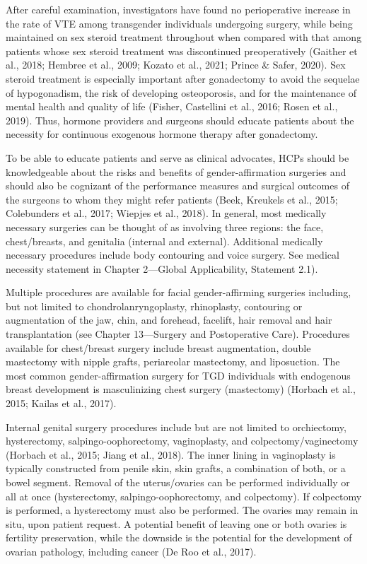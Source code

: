 \documentclass[
]{book}
\begin{document}
After careful examination, investigators have
found no perioperative increase in the rate of
VTE among transgender individuals undergoing
surgery, while being maintained on sex steroid
treatment throughout when compared with that
among patients whose sex steroid treatment was
discontinued preoperatively (Gaither et al., 2018;
Hembree et al., 2009; Kozato et al., 2021; Prince
\& Safer, 2020). Sex steroid treatment is especially
important after gonadectomy to avoid the sequelae
of hypogonadism, the risk of developing osteoporosis, and for the maintenance of mental health
and quality of life (Fisher, Castellini et al., 2016;
Rosen et al., 2019). Thus, hormone providers and
surgeons should educate patients about the necessity for continuous exogenous hormone therapy
after gonadectomy.

To be able to educate patients and serve as
clinical advocates, HCPs should be knowledgeable
about the risks and benefits of gender-affirmation
surgeries and should also be cognizant of the
performance measures and surgical outcomes of
the surgeons to whom they might refer patients
(Beek, Kreukels et al., 2015; Colebunders et al.,
2017; Wiepjes et al., 2018). In general, most medically necessary surgeries can be thought of as
involving three regions: the face, chest/breasts,
and genitalia (internal and external). Additional
medically necessary procedures include body contouring and voice surgery. See medical necessity
statement in Chapter 2---Global Applicability,
Statement 2.1).

Multiple procedures are available for facial
gender-affirming surgeries including, but not limited to chondrolanryngoplasty, rhinoplasty, contouring or augmentation of the jaw, chin, and
forehead, facelift, hair removal and hair transplantation (see Chapter 13---Surgery and
Postoperative Care). Procedures available for
chest/breast surgery include breast augmentation,
double mastectomy with nipple grafts, periareolar
mastectomy, and liposuction. The most common
gender-affirmation surgery for TGD individuals
with endogenous breast development is masculinizing chest surgery (mastectomy) (Horbach
et al., 2015; Kailas et al., 2017).

Internal genital surgery procedures include but
are not limited to orchiectomy, hysterectomy,
salpingo-oophorectomy, vaginoplasty, and colpectomy/vaginectomy (Horbach et al., 2015; Jiang
et al., 2018). The inner lining in vaginoplasty is
typically constructed from penile skin, skin grafts,
a combination of both, or a bowel segment.
Removal of the uterus/ovaries can be performed
individually or all at once (hysterectomy,
salpingo-oophorectomy, and colpectomy). If
colpectomy is performed, a hysterectomy must
also be performed. The ovaries may remain in
situ, upon patient request. A potential benefit of
leaving one or both ovaries is fertility preservation, while the downside is the potential for the
development of ovarian pathology, including cancer (De Roo et al., 2017).
\end{document}

